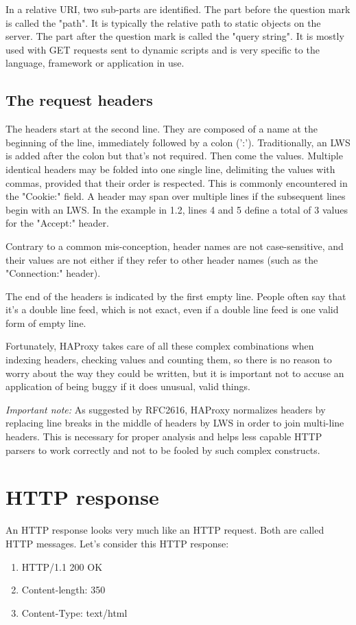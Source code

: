 In a relative URI, two sub-parts are identified. The part before the question
mark is called the "path". It is typically the relative path to static objects
on the server. The part after the question mark is called the "query string".
It is mostly used with GET requests sent to dynamic scripts and is very
specific to the language, framework or application in use.

\subsection{The request headers}
The headers start at the second line. They are composed of a name at the
beginning of the line, immediately followed by a colon (':'). Traditionally,
an LWS is added after the colon but that's not required. Then come the values.
Multiple identical headers may be folded into one single line, delimiting the
values with commas, provided that their order is respected. This is commonly
encountered in the "Cookie:" field. A header may span over multiple lines if
the subsequent lines begin with an LWS. In the example in 1.2, lines 4 and 5
define a total of 3 values for the "Accept:" header.

Contrary to a common mis-conception, header names are not case-sensitive, and
their values are not either if they refer to other header names (such as the
"Connection:" header).

The end of the headers is indicated by the first empty line. People often say
that it's a double line feed, which is not exact, even if a double line feed
is one valid form of empty line.

Fortunately, HAProxy takes care of all these complex combinations when indexing
headers, checking values and counting them, so there is no reason to worry
about the way they could be written, but it is important not to accuse an
application of being buggy if it does unusual, valid things.

\emph{Important note:}
   As suggested by RFC2616, HAProxy normalizes headers by replacing line breaks
   in the middle of headers by LWS in order to join multi-line headers. This
   is necessary for proper analysis and helps less capable HTTP parsers to work
   correctly and not to be fooled by such complex constructs.


\section{HTTP response}
An HTTP response looks very much like an HTTP request. Both are called HTTP
messages. Let's consider this HTTP response:
\begin{enumerate}
\item HTTP/1.1 200 OK
\item Content-length: 350
\item Content-Type: text/html
\end{enumerate}

